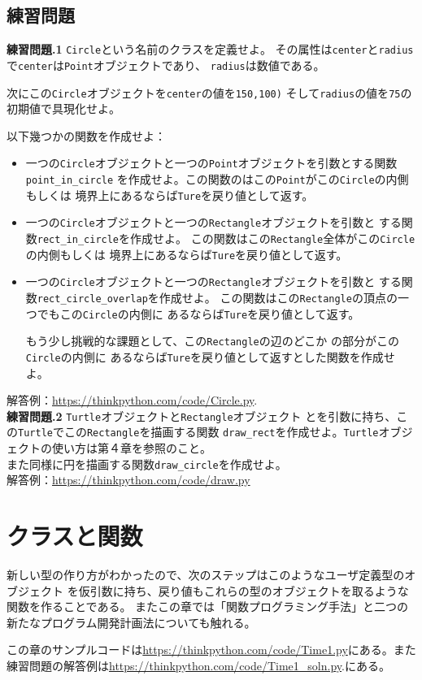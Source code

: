 \documentclass[a4j,12pt,makeidx]{jbook}
\newcommand{\tp}{\thechapter}
\begin{document}
\section{練習問題}
\noindent
{\bf 練習問題\tp.1} {\tt Circle}という名前のクラスを定義せよ。
その属性は{\tt center}と{\tt radius}で{\tt center}は{\tt Point}オブジェクトであり、
{\tt radius}は数値である。\par
次にこの{\tt Circle}オブジェクトを{\tt center}の値を{\tt 150,100)}
そして{\tt radius}の値を{\tt 75}の初期値で具現化せよ。\par
以下幾つかの関数を作成せよ：
\begin{itemize}
\item 一つの{\tt Circle}オブジェクトと一つの{\tt Point}オブジェクトを引数とする関数{\tt point\_in\_circle}
を作成せよ。この関数のはこの{\tt Point}がこの{\tt Circle}の内側もしくは
境界上にあるならば{\tt Ture}を戻り値として返す。
\item 一つの{\tt Circle}オブジェクトと一つの{\tt Rectangle}オブジェクトを引数と
する関数{\tt rect\_in\_circle}を作成せよ。
この関数はこの{\tt Rectangle}全体がこの{\tt Circle}の内側もしくは
境界上にあるならば{\tt Ture}を戻り値として返す。
\item 一つの{\tt Circle}オブジェクトと一つの{\tt Rectangle}オブジェクトを引数と
する関数{\tt rect\_circle\_overlap}を作成せよ。
この関数はこの{\tt Rectangle}の頂点の一つでもこの{\tt Circle}の内側に
あるならば{\tt Ture}を戻り値として返す。\par
もう少し挑戦的な課題として、この{\tt Rectangle}の辺のどこか
の部分がこの{\tt Circle}の内側に
あるならば{\tt Ture}を戻り値として返すとした関数を作成せよ。
\end{itemize}
解答例：\url{https://thinkpython.com/code/Circle.py}.\\

\noindent
{\bf 練習問題\tp.2} {\tt Turtle}オブジェクトと{\tt Rectangle}オブジェクト
とを引数に持ち、この{\tt Turtle}でこの{\tt Rectangle}を描画する関数
{\tt draw\_rect}を作成せよ。{\tt Turtle}オブジェクトの使い方は第４章を参照のこと。\\
また同様に円を描画する関数{\tt draw\_circle}を作成せよ。\\
解答例：\url{https://thinkpython.com/code/draw.py}
%
\chapter{クラスと関数}
新しい型の作り方がわかったので、次のステップはこのようなユーザ定義型のオブジェクト
を仮引数に持ち、戻り値もこれらの型のオブジェクトを取るような関数を作ることである。
またこの章では「関数プログラミング手法」と二つの新たなプログラム開発計画法についても触れる。\par
この章のサンプルコードは\url{https://thinkpython.com/code/Time1.py}にある。また
練習問題の解答例は\url{https://thinkpython.com/code/Time1_soln.py}.にある。
%
\end{document}
